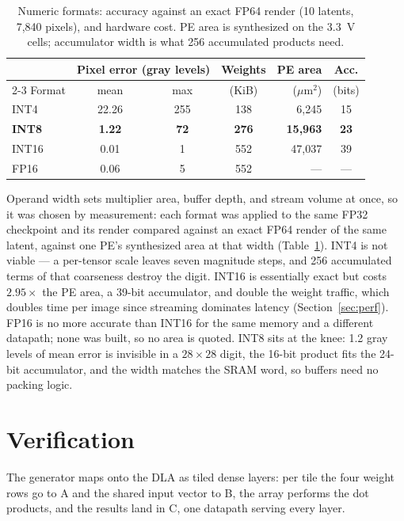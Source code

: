 \documentclass[conference,a4paper]{APSIPA2026}
\begin{document}
\begin{table}[!ht]
\caption{Numeric formats: accuracy against an exact FP64 render (10 latents, 7{,}840 pixels), and hardware cost. PE area is synthesized on the 3.3~V cells; accumulator width is what 256 accumulated products need.}
\label{tab:format}
\centering
\renewcommand{\arraystretch}{1.0}
\begin{tabular}{@{}lcccrc@{}}
\toprule
 & \multicolumn{2}{c}{Pixel error (gray levels)} & Weights & PE area & Acc. \\
\cmidrule(lr){2-3}
Format & mean & max & (KiB) & ($\mu$m$^2$) & (bits) \\
\midrule
INT4   & 22.26 & 255 & 138 & 6{,}245  & 15 \\
\textbf{INT8}  & \textbf{1.22} & \textbf{72} & \textbf{276} & \textbf{15{,}963} & \textbf{23} \\
INT16  & 0.01  & 1   & 552 & 47{,}037 & 39 \\
FP16   & 0.06  & 5   & 552 & ---      & --- \\
\bottomrule
\end{tabular}
\end{table}
Operand width sets multiplier area, buffer depth, and stream volume at once, so it was chosen by measurement: each format was applied to the same FP32 checkpoint and its render compared against an exact FP64 render of the same latent, against one PE's synthesized area at that width (Table~\ref{tab:format}). INT4 is not viable --- a per-tensor scale leaves seven magnitude steps, and 256 accumulated terms of that coarseness destroy the digit. INT16 is essentially exact but costs $2.95\times$ the PE area, a 39-bit accumulator, and double the weight traffic, which doubles time per image since streaming dominates latency (Section~\ref{sec:perf}). FP16 is no more accurate than INT16 for the same memory and a different datapath; none was built, so no area is quoted. INT8 sits at the knee: 1.2 gray levels of mean error is invisible in a $28\times28$ digit, the 16-bit product fits the 24-bit accumulator, and the width matches the SRAM word, so buffers need no packing logic.

\section{Verification}\label{sec:map}

The generator maps onto the DLA as tiled dense layers: per tile the four weight rows go to A and the shared input vector to B, the array performs the dot products, and the results land in C, one datapath serving every layer.
\end{document}

